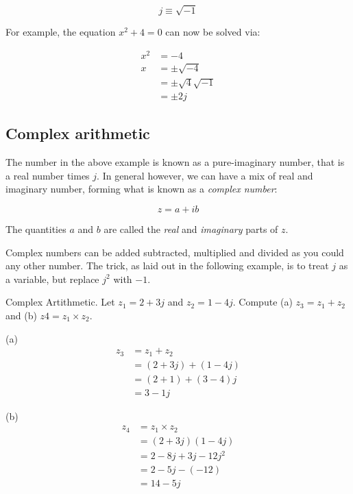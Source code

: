 \documentclass{tufte-book}
\begin{document}
\begin{equation}\label{def_imagnum}
j \equiv \sqrt{-1}
\end{equation}

\noindent For example, the equation $x^2 + 4 = 0$ can now be solved via:

\begin{align*}
x^2 &= -4 \\
x &= \pm \sqrt{-4}  \\
&= \pm \sqrt{4}\sqrt{-1} \\
&= \pm2j
\end{align*}

\subsection{Complex arithmetic}
The number in the above example is known as a pure-imaginary number, that is a real number times $j$. In general however, we can have a mix of real and imaginary number, forming what is known as a \textit{complex number}:

\begin{equation}\label{def:cpxnum}
z = a + ib
\end{equation}

\noindent The quantities $a$ and $b$ are called the \textit{real} and \textit{imaginary} parts of $z$.

Complex numbers can be added subtracted, multiplied and divided as you could any other number. The trick, as laid out in the following example, is to treat $j$ as a variable, but replace $j^2$ with $-1$.

\begin{myexample}[label = ex:its_complicated]{Complex Artithmetic.}
Let $z_1 = 2+3j$ and $z_2 = 1-4j$. Compute (a) $z_3 = z_1 + z_2$ and (b) $z4 = z_1\times z_2$.

(a) \begin{align*}
z_3  &= z_1+z_2 \\
& = \left(2+3j\right) + \left(1-4j\right) \\
&=  \left(2+1\right) + (3-4)j \\
&= 3 -1j
\end{align*}

(b)\begin{align*}
z_4  &= z_1\times z_2 \\
& = \left(2+3j\right) \left(1-4j\right) \\
&=  2 - 8j + 3j -12j^2 \\
&= 2 - 5j -(-12) \\
&= 14-5j
\end{align*}
\end{myexample}
\end{document}
